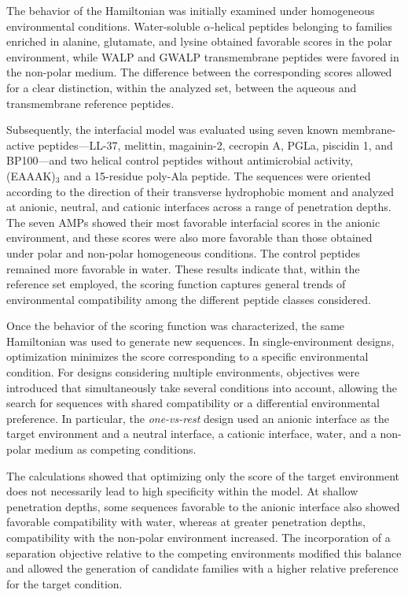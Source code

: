 The behavior of the Hamiltonian was initially examined under homogeneous environmental conditions. Water-soluble $\alpha$-helical peptides belonging to families enriched in alanine, glutamate, and lysine obtained favorable scores in the polar environment, while WALP and GWALP transmembrane peptides were favored in the non-polar medium. The difference between the corresponding scores allowed for a clear distinction, within the analyzed set, between the aqueous and transmembrane reference peptides.

Subsequently, the interfacial model was evaluated using seven known membrane-active peptides—LL-37, melittin, magainin-2, cecropin A, PGLa, piscidin 1, and BP100—and two helical control peptides without antimicrobial activity, (EAAAK)$_{3}$ and a 15-residue poly-Ala peptide. The sequences were oriented according to the direction of their transverse hydrophobic moment and analyzed at anionic, neutral, and cationic interfaces across a range of penetration depths. The seven AMPs showed their most favorable interfacial scores in the anionic environment, and these scores were also more favorable than those obtained under polar and non-polar homogeneous conditions. The control peptides remained more favorable in water. These results indicate that, within the reference set employed, the scoring function captures general trends of environmental compatibility among the different peptide classes considered.

Once the behavior of the scoring function was characterized, the same Hamiltonian was used to generate new sequences. In single-environment designs, optimization minimizes the score corresponding to a specific environmental condition. For designs considering multiple environments, objectives were introduced that simultaneously take several conditions into account, allowing the search for sequences with shared compatibility or a differential environmental preference. In particular, the \textit{one-vs-rest} design used an anionic interface as the target environment and a neutral interface, a cationic interface, water, and a non-polar medium as competing conditions.

The calculations showed that optimizing only the score of the target environment does not necessarily lead to high specificity within the model. At shallow penetration depths, some sequences favorable to the anionic interface also showed favorable compatibility with water, whereas at greater penetration depths, compatibility with the non-polar environment increased. The incorporation of a separation objective relative to the competing environments modified this balance and allowed the generation of candidate families with a higher relative preference for the target condition.

